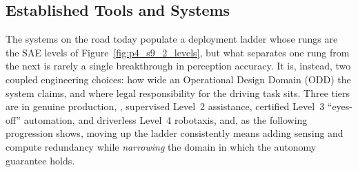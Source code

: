 \subsection{Established Tools and Systems}
\label{subsec:p4-sec9-2-established-tools-and-systems}
The systems on the road today populate a deployment ladder whose rungs are the SAE levels of Figure~\ref{fig:p4_s9_2_levels}, but what separates one rung from the next is rarely a single breakthrough in perception accuracy.
It is, instead, two coupled engineering choices: how wide an Operational Design Domain (ODD) the system claims, and where legal responsibility for the driving task sits.
Three tiers are in genuine production, \ie, supervised Level~2 assistance, certified Level~3 ``eyes-off'' automation, and driverless Level~4 robotaxis, and, as the following progression shows, moving up the ladder consistently means adding sensing and compute redundancy while \emph{narrowing} the domain in which the autonomy guarantee holds.

